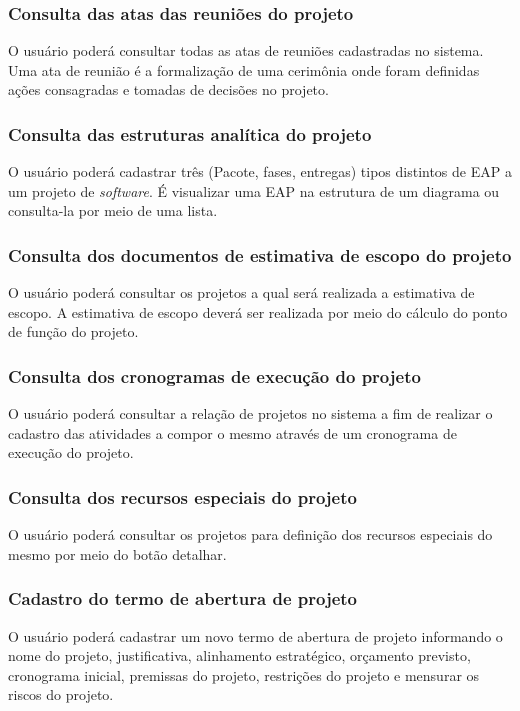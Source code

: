 \documentclass{acm_proc_article-sp}
\begin{document}
\subsubsection{Consulta das atas das reuniões do projeto}
O usuário poderá consultar todas as atas de reuniões cadastradas no sistema. Uma ata de reunião é a formalização de uma cerimônia onde foram definidas ações consagradas e tomadas de decisões no projeto.

\subsubsection{Consulta das estruturas analítica do projeto}
O usuário poderá cadastrar três (Pacote, fases, entregas) tipos distintos de EAP a um projeto de \textit{software}. É visualizar uma EAP na estrutura de um diagrama ou consulta-la por meio de uma lista. 

\subsubsection{Consulta dos documentos de estimativa de escopo do projeto}
O usuário poderá consultar os projetos a qual será realizada a estimativa de escopo. A estimativa de escopo deverá ser realizada por meio do cálculo do ponto de função do projeto.

\subsubsection{Consulta dos cronogramas de execução do projeto}
O usuário poderá consultar a relação de projetos no sistema a fim de realizar o cadastro das atividades a compor o mesmo através de um cronograma de execução do projeto.

\subsubsection{Consulta dos recursos especiais do projeto}
O usuário poderá consultar os projetos para definição dos recursos especiais do mesmo por meio do botão detalhar.

\subsubsection{Cadastro do termo de abertura de projeto}
O usuário poderá cadastrar um novo termo de abertura de projeto informando o nome do projeto, justificativa, alinhamento estratégico, orçamento previsto, cronograma inicial, premissas do projeto, restrições do projeto e mensurar os riscos do projeto. 
\end{document}
